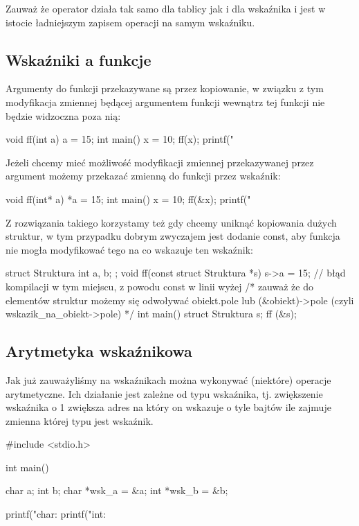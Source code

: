\documentclass{pdfBooklets}
\begin{document}
Zauważ że operator  działa tak samo dla tablicy jak i dla wskaźnika i jest w istocie ładniejszym zapisem operacji  na samym wskaźniku.

\subsection{Wskaźniki a funkcje}
Argumenty do funkcji przekazywane są przez kopiowanie, w związku z tym modyfikacja zmiennej będącej argumentem funkcji wewnątrz tej funkcji nie będzie widzoczna poza nią:
\begin{CodeFrame*}[c]{}
void ff(int a) {
    a = 15;
}
int main() {
    x = 10;
    ff(x);
    printf("%
}
\end{CodeFrame*}

Jeżeli chcemy mieć możliwość modyfikacji zmiennej przekazywanej przez argument możemy przekazać zmienną do funkcji przez wskaźnik:
\begin{CodeFrame*}[c]{}
void ff(int* a) {
    *a = 15;
}
int main() {
    x = 10;
    ff(&x);
    printf("%
}
\end{CodeFrame*}

Z rozwiązania takiego korzystamy też gdy chcemy uniknąć kopiowania dużych struktur, w tym przypadku dobrym zwyczajem jest dodanie const, aby funkcja nie mogła modyfikować tego na co wskazuje ten wskaźnik:

\begin{CodeFrame*}[c]{}
struct Struktura {
  int a, b;
};
void ff(const struct Struktura *s) {
    s->a = 15; // błąd kompilacji w tym miejscu, z powodu const w linii wyżej
    /* zauważ że do elementów struktur możemy się odwoływać
       obiekt.pole lub (&obiekt)->pole (czyli wskazik_na_obiekt->pole) */
}
int main() {
    struct Struktura s;
    ff (&s);
}
\end{CodeFrame*}


\subsection{Arytmetyka wskaźnikowa}

Jak już zauważyliśmy na wskaźnikach można wykonywać (niektóre) operacje arytmetyczne. Ich działanie jest zależne od typu wskaźnika, tj. zwiększenie wskaźnika o 1 zwiększa adres na który on wskazuje o tyle bajtów ile zajmuje zmienna której typu jest wskaźnik.

\begin{CodeFrame*}[c]{}
#include <stdio.h>

int main() {
    char a;    int    b;
    char *wsk_a = &a;
    int    *wsk_b = &b;
    
    printf("char: %
    printf("int:    %
}
\end{CodeFrame*}
\end{document}
